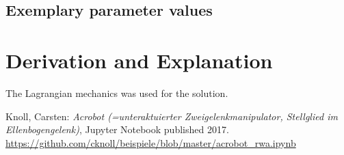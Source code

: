 \documentclass[10pt,a4paper]{article}
\begin{document}
	
	\subsection{Exemplary parameter values}
	

	
	\section{Derivation and Explanation} %
	The Lagrangian mechanics was used for the solution.
	
	
	
	\begin{thebibliography}{10}		
		Knoll, Carsten: 
		\textit{Acrobot (=unteraktuierter Zweigelenkmanipulator, Stellglied im Ellenbogengelenk)}, Jupyter Notebook published 2017. \\
		\url{https://github.com/cknoll/beispiele/blob/master/acrobot_rwa.ipynb}
	\end{thebibliography}
\end{document}
